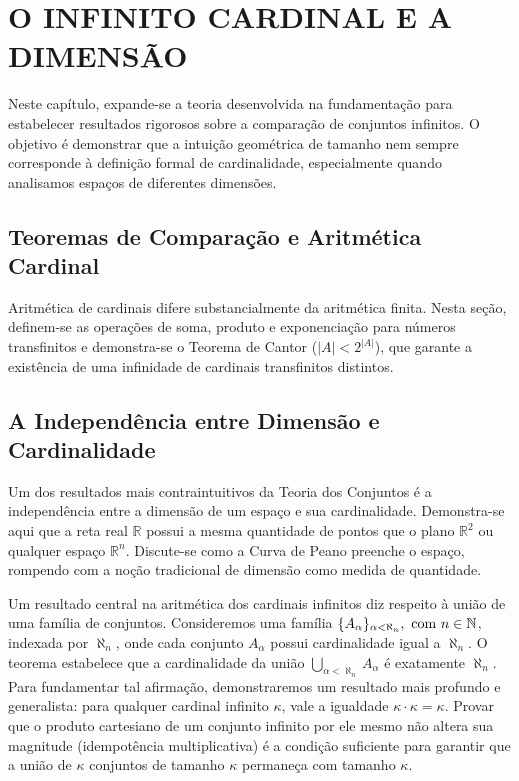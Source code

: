 \chapter{O INFINITO CARDINAL E A DIMENSÃO}
\label{chap:cardinais_dimensao}

Neste capítulo, expande-se a teoria desenvolvida na fundamentação para estabelecer resultados rigorosos sobre a comparação de conjuntos infinitos. O objetivo é demonstrar que a intuição geométrica de tamanho nem sempre corresponde à definição formal de cardinalidade, especialmente quando analisamos espaços de diferentes dimensões.

\section{Teoremas de Comparação e Aritmética Cardinal}
\label{sec:aritmetica}
Aritmética de cardinais difere substancialmente da aritmética finita. Nesta seção, definem-se as operações de soma, produto e exponenciação para números transfinitos e demonstra-se o Teorema de Cantor (\(|A| < 2^{|A|}\)), que garante a existência de uma infinidade de cardinais transfinitos distintos.

\section{A Independência entre Dimensão e Cardinalidade}
\label{sec:dimensao}
Um dos resultados mais contraintuitivos da Teoria dos Conjuntos é a independência entre a dimensão de um espaço e sua cardinalidade. Demonstra-se aqui que a reta real \(\mathbb{R}\) possui a mesma quantidade de pontos que o plano \(\mathbb{R}^2\) ou qualquer espaço \(\mathbb{R}^n\). Discute-se como a Curva de Peano preenche o espaço, rompendo com a noção tradicional de dimensão como medida de quantidade.

Um resultado central na aritmética dos cardinais infinitos diz respeito à união de uma família de conjuntos. Consideremos uma família $\{A_\alpha\}_{\alpha < \aleph_n}, \text{ com } n \in \mathbb{N}$, indexada por $\aleph_n$, onde cada conjunto $A_\alpha$ possui cardinalidade igual a $\aleph_n$. O teorema estabelece que a cardinalidade da união $\bigcup_{\alpha < \aleph_n} A_\alpha$ é exatamente $\aleph_n$. Para fundamentar tal afirmação, demonstraremos um resultado mais profundo e generalista: para qualquer cardinal infinito $\kappa$, vale a igualdade $\kappa \cdot \kappa = \kappa$. Provar que o produto cartesiano de um conjunto infinito por ele mesmo não altera sua magnitude (idempotência multiplicativa) é a condição suficiente para garantir que a união de $\kappa$ conjuntos de tamanho $\kappa$ permaneça com tamanho $\kappa$.


